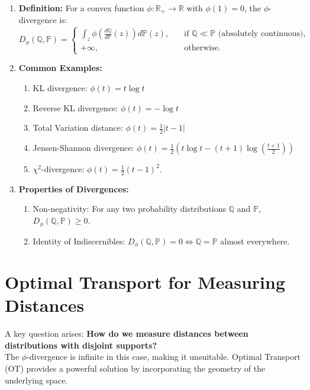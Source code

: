 \documentclass[12pt]{report}
\begin{document}
\begin{enumerate}
    \item \textbf{Definition:} For a convex function $\phi: \mathbb{R}_+ \to \mathbb{R}$ with $\phi(1)=0$, the $\phi$-divergence is:
    \[
        D_{\phi}(\mathbb{Q}, \mathbb{P}) =
        \begin{cases}
            \displaystyle \int_{z} \phi \left(\frac{d\mathbb{Q}}{d\mathbb{P}}(z) \right) d\mathbb{P}(z), & \quad \text{if } \mathbb{Q} \ll \mathbb{P} \text{ (absolutely continuous)}, \\
            +\infty, & \quad \text{otherwise}.
        \end{cases}
    \]
    
    \item \textbf{Common Examples:}
    \begin{enumerate}
        \item KL divergence: $\phi(t) = t \log t$
        \item Reverse KL divergence: $\phi(t) = -\log t$
        \item Total Variation distance: $\phi(t) = \frac{1}{2} |t - 1|$
        \item Jensen-Shannon divergence: $\phi(t) = \frac{1}{2} \left( t \log t - (t+1)\log \left(\frac{t+1}{2}\right) \right)$
        \item $\chi^2$-divergence: $\phi(t) = \frac{1}{2}(t-1)^2$.
    \end{enumerate}
    
    \item \textbf{Properties of Divergences:}
    \begin{enumerate}
        \item Non-negativity: For any two probability distributions $\mathbb{Q}$ and $\mathbb{P}$, $D_\phi(\mathbb{Q}, \mathbb{P}) \ge 0$.
        \item Identity of Indiscernibles: $D_\phi(\mathbb{Q}, \mathbb{P}) = 0 \iff \mathbb{Q} = \mathbb{P}$ almost everywhere.
    \end{enumerate}
\end{enumerate}

\section{Optimal Transport for Measuring Distances}

A key question arises: \textbf{How do we measure distances between distributions with disjoint supports?} \\ 
The $\phi$-divergence is infinite in this case, making it unsuitable. Optimal Transport (OT) provides a powerful solution by incorporating the geometry of the underlying space.
\end{document}
